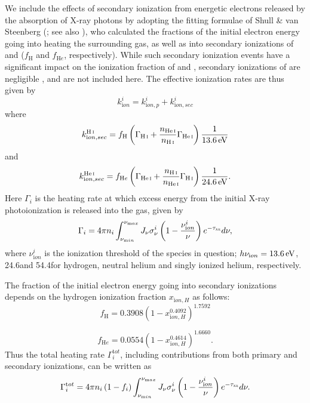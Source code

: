 \documentclass[../thesis.tex]{subfiles}
\begin{document}
We include the effects of secondary ionization from energetic electrons released by the absorption of X-ray photons by adopting the fitting formulae of Shull \& van Steenberg (\citeyear{ShullvanSteenberg1985}; see also \citealt{ValdesFerrara2008, FurlanettoStoever2010}), who calculated the fractions of the initial electron energy going into heating the surrounding gas, as well as into secondary ionizations of \HI and \HeI ($f_{\mathrm H}$ and $f_{\mathrm He}$, respectively). While such secondary ionization events have a significant impact on the ionization fraction of \HI and \HeI, secondary ionizations of \HeII are negligible \citep{ShullvanSteenberg1985}, and are not included here.  The effective ionization rates are thus given by
\begin{equation}
k^i_{\mathrm ion} = k^i_{\mathrm ion, p} + k^i_{\mathrm ion, sec}
\end{equation}
where
\begin{equation}
k^{\mathrm {\mathrm{H\,\textsc{i}}}}_{\mathrm ion, sec} = f_{\mathrm H} \left( \Gamma_{\mathrm {\mathrm{H\,\textsc{i}}}} + \frac{n_{\mathrm {\mathrm{He\,\textsc{i}}}}}{ n_{\mathrm {\mathrm{H\,\textsc{i}}}}} \Gamma_{\mathrm {\mathrm{He\,\textsc{i}}}} \right) \frac{1}{13.6\,\mathrm{eV}}
\end{equation}
and
\begin{equation}
k^{\mathrm {\mathrm{He\,\textsc{i}}}}_{\mathrm ion, sec} = f_{\mathrm He} \left( \Gamma_{\mathrm {\mathrm{He\,\textsc{i}}}} + \frac{n_{\mathrm {\mathrm{H\,\textsc{i}}}}}{ n_{\mathrm {\mathrm{He\,\textsc{i}}}}} \Gamma_{\mathrm {\mathrm{H\,\textsc{i}}}} \right) \frac{1}{24.6\,\mathrm{eV}}.
\end{equation}
Here $\Gamma_i$ is the heating rate at which excess energy from the initial X-ray photoionization is released into the gas, given by
\begin{equation}
\Gamma_i = 4\pi n_i \int_{\nu_{\mathrm min}}^{\nu_{\mathrm max}} J_{\nu} \sigma^i_{\nu}
\left(1 - \frac{\nu^i_{\mathrm ion}}{\nu} \right) e^{-\tau_{\textsc{xr}}} d\nu,
\end{equation} 
where $\nu^i_{\mathrm ion}$ is the ionization threshold of the species in question; $h\nu_{\mathrm ion} = 13.6\,\mathrm{eV}$, 24.6\ev and 54.4\ev for hydrogen, neutral helium and singly ionized helium, respectively.

The fraction of the initial electron energy going into secondary ionizations depends on the hydrogen ionization fraction $x_{\mathrm ion, H}$ as follows:
\begin{equation}
f_{\mathrm H} = 0.3908 \left( 1 - x_{\mathrm ion, H}^{0.4092} \right) ^{1.7592}
\end{equation}

\begin{equation}
f_{\mathrm He} = 0.0554 \left( 1 - x_{\mathrm ion, H}^{0.4614} \right) ^{1.6660}.
\end{equation}
Thus the total heating rate $\Gamma_i^{\mathrm tot}$, including contributions from both primary and secondary ionizations, can be written as
\begin{equation}
\Gamma_i^{\mathrm tot} = 4\pi n_i \left(1 - f_i \right)
\int_{\nu_{\mathrm min}}^{\nu_{\mathrm max}} J_{\nu} \sigma^i_{\nu}
\left(1 - \frac{\nu^i_{\mathrm ion}}{\nu} \right) e^{-\tau_{\textsc{xr}}} d\nu.
\end{equation}
\end{document}
